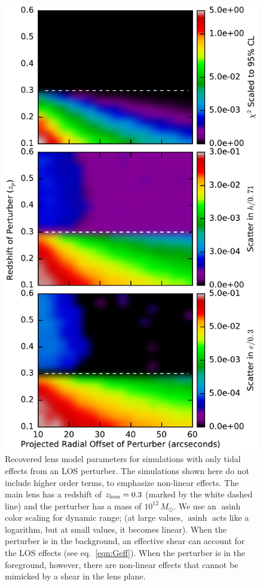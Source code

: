 \documentclass{emulateapj}
\newcommand\asinh[0]{\operatorname{asinh}}
\begin{document}
\begin{figure}[t]
\begin{center}
\includegraphics[width=1.0\columnwidth]{frontback.pdf}
\caption{\label{fig:frontback} Recovered lens model parameters for simulations with only tidal effects from an LOS perturber. The simulations shown here do not include higher order terms, to emphasize non-linear effects.  The main lens has a redshift of $z_{\rm{lens}} = 0.3$ (marked by the white dashed line) and the perturber has a mass of $10^{12}\, M_\odot$.  We use an $\asinh$ color scaling for dynamic range; (at large values, $\asinh$ acts like a logarithm, but at small values, it becomes linear).  When the perturber is in the background, an effective shear can account for the LOS effects (see eq.\ \ref{eqn:Geff}).  When the perturber is in the foreground, however, there are non-linear effects that cannot be mimicked by a shear in the lens plane.
}
\end{center}
\end{figure}
\end{document}
